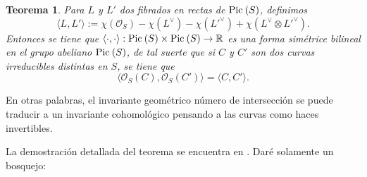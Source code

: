 \documentclass[spanish,12pt]{amsart}
\newcommand{\Pic}[1]{\textup{Pic}{ \: (#1)}}
\newtheorem{theorem}{Teorema}[section]
\theoremstyle{definition}
\theoremstyle{remark}
\numberwithin{equation}{section}
\newcommand{\reals}{\mathbb{R}}
\renewcommand{\O}{\mathcal{O}}
\begin{document}
\begin{theorem}\label{th:teorema 1}
Para $L$ y $L'$ dos fibrados en rectas de $\Pic S$, definimos
\[
   \langle L , L' \rangle  := \chi (\O_S) - \chi (L^\vee) - \chi (L'^{\vee}) + \chi (L^\vee \otimes L'^{\vee}).
\]
Entonces se tiene que $\langle \cdot, \cdot \rangle : \Pic S \times \Pic S \to \reals$ es una forma simétrice bilineal en el grupo abeliano $\Pic S$, de tal suerte que si $C$ y $C'$ son dos curvas irreducibles distintas en $S$, se tiene que
\[
    \langle \O_S (C), \O_ S (C')\rangle = \langle C,C'\rangle.
\]
\end{theorem}

En otras palabras, el invariante geométrico número de intersección se puede traducir a un invariante cohomológico pensando a las curvas como haces invertibles.

La demostración detallada del teorema se encuentra en \cite{beauville1996complexAlgebraicSurfaces}. Daré solamente un bosquejo:
\end{document}

